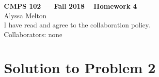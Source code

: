 \documentclass[11pt]{article}
\begin{document}
	\begin{center}
		{\bf\Large CMPS 102 --- Fall 2018 --  Homework 4}\\
		Alyssa Melton\\
		I have read and agree to the collaboration policy. \\
		Collaborators: none\\
	\end{center}


	\section*{Solution to Problem 2}
\end{document}
